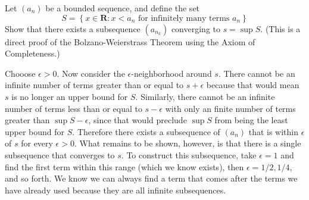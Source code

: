 \begin{exercise}
  Let $\left(a_{n}\right)$ be a bounded sequence, and define the set
  $$
  S=\left\{x \in \mathbf{R}: x<a_{n} \text { for infinitely many terms } a_{n}\right\}
  $$
  Show that there exists a subsequence $\left(a_{n_{k}}\right)$ converging to $s=\sup S$. (This is a direct proof of the Bolzano-Weierstrass Theorem using the Axiom of Completeness.)
\end{exercise}

\begin{solution}
  Chooose $\epsilon > 0$. Now consider the $\epsilon$-neighborhood around $s$. There cannot be an infinite number of terms greater than or equal to $s + \epsilon$ because that would mean $s$ is no longer an upper bound for $S$. Similarly, there cannot be an infinite number of terms less than or equal to $s - \epsilon$ with only an finite number of terms greater than $\sup S - \epsilon$, since that would preclude $\sup S$ from being the least upper bound for $S$. Therefore there exists a subsequence of $(a_n)$ that is within $\epsilon$ of $s$ for every $\epsilon > 0$. What remains to be shown, however, is that there is a single subsequence that converges to $s$. To construct this subsequence, take $\epsilon = 1$ and find the first term within this range (which we know exists), then $\epsilon = 1/2, 1/4$, and so forth. We know we can always find a term that comes after the terms we have already used because they are all infinite subsequences.
\end{solution}